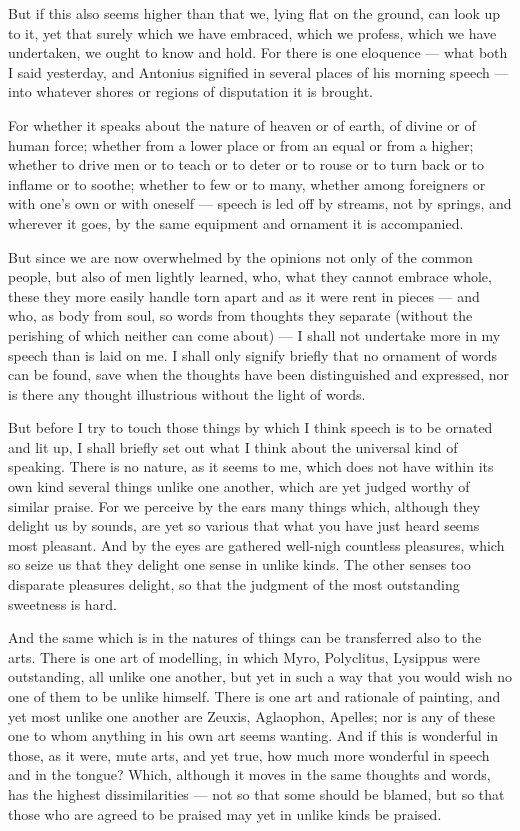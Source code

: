  But if this also seems higher than that we, lying flat on the ground, can look up to it, yet that surely which we have embraced, which we profess, which we have undertaken, we ought to know and hold. For there is one eloquence — what both I said yesterday, and Antonius signified in several places of his morning speech — into whatever shores or regions of disputation it is brought.

 For whether it speaks about the nature of heaven or of earth, of divine or of human force; whether from a lower place or from an equal or from a higher; whether to drive men or to teach or to deter or to rouse or to turn back or to inflame or to soothe; whether to few or to many, whether among foreigners or with one's own or with oneself — speech is led off by streams, not by springs, and wherever it goes, by the same equipment and ornament it is accompanied.

 But since we are now overwhelmed by the opinions not only of the common people, but also of men lightly learned, who, what they cannot embrace whole, these they more easily handle torn apart and as it were rent in pieces — and who, as body from soul, so words from thoughts they separate (without the perishing of which neither can come about) — I shall not undertake more in my speech than is laid on me. I shall only signify briefly that no ornament of words can be found, save when the thoughts have been distinguished and expressed, nor is there any thought illustrious without the light of words.

 But before I try to touch those things by which I think speech is to be ornated and lit up, I shall briefly set out what I think about the universal kind of speaking. There is no nature, as it seems to me, which does not have within its own kind several things unlike one another, which are yet judged worthy of similar praise. For we perceive by the ears many things which, although they delight us by sounds, are yet so various that what you have just heard seems most pleasant. And by the eyes are gathered well-nigh countless pleasures, which so seize us that they delight one sense in unlike kinds. The other senses too disparate pleasures delight, so that the judgment of the most outstanding sweetness is hard.

 And the same which is in the natures of things can be transferred also to the arts. There is one art of modelling, in which Myro, Polyclitus, Lysippus were outstanding, all unlike one another, but yet in such a way that you would wish no one of them to be unlike himself. There is one art and rationale of painting, and yet most unlike one another are Zeuxis, Aglaophon, Apelles; nor is any of these one to whom anything in his own art seems wanting. And if this is wonderful in those, as it were, mute arts, and yet true, how much more wonderful in speech and in the tongue? Which, although it moves in the same thoughts and words, has the highest dissimilarities — not so that some should be blamed, but so that those who are agreed to be praised may yet in unlike kinds be praised.

